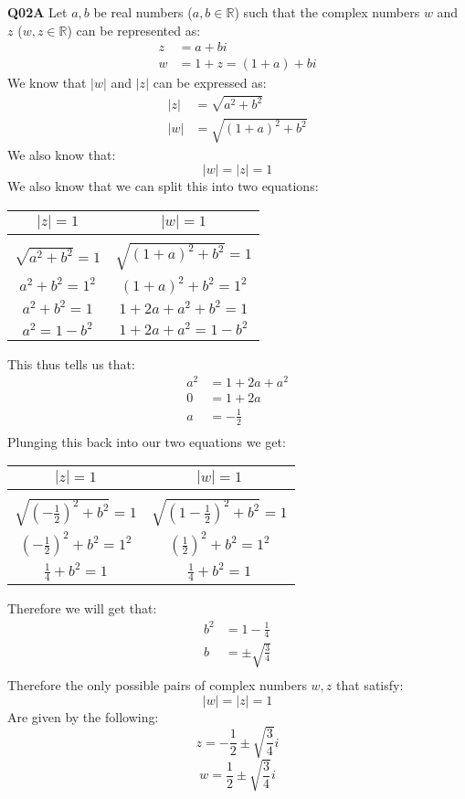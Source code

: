 \documentclass[11pt]{article}
\begin{document}
\parindent=0pt

\textbf{Q02A} Let $a, b$ be real numbers ($a,b \in \mathbb{R}$) such that the complex numbers $w$ and $z$  ($w,z \in \mathbb{R}$) can be represented as:
\begin{align*}
 z & = a + bi \\
 w  & = 1+ z = (1+a) + bi
\end{align*}
We know that $|w|$ and $|z|$ can be expressed as:
\begin{align*}
 |z| & = \sqrt{a^2 + b^2} \\
 |w|  & = \sqrt{ (1+a)^2 + b^2}
\end{align*}
We also know that:
\[ |w| = |z| = 1 \]
We also know that we can split this into two equations:
\begin{center}
 \begin{tabular}{ c  |  c } 
  $|z| = 1$ &  $|w| = 1$ \\ 
\hline\\
 $\sqrt{a^2 + b^2} = 1 $ & $\sqrt{ (1+a)^2 + b^2} = 1 $  \\ 
             $a^2 + b^2 = 1^2 $ &  $(1+a)^2 + b^2 = 1^2 $ \\ 
             $a^2 + b^2 = 1 $ &  $ 1 + 2a + a^2 + b^2 = 1 $ \\ 
             $a^2  = 1 - b^2 $ &  $ 1 + 2a + a^2 = 1 - b^2 $ \\ 

\end{tabular}
\end{center}
This thus tells us that:
\begin{align*}
a^2 &= 1 + 2a + a^2 \\
 0 &= 1 + 2a \\
 a & = -\frac{1}{2}\\
\end{align*}
Plunging this back into our two equations we get:
\begin{center}
\begin{tabular}{ c  |  c } 
  $|z| = 1$ &  $|w| = 1$ \\ 
\hline\\
 $\sqrt{(-\frac{1}{2})^2 + b^2} = 1 $ & $\sqrt{ (1-\frac{1}{2})^2 + b^2} = 1 $  \\ 
             $(-\frac{1}{2})^2  + b^2 = 1^2 $ &  $(\frac{1}{2})^2 + b^2 = 1^2 $ \\ 
             $\frac{1}{4} + b^2 = 1 $ &  $ \frac{1}{4} + b^2 = 1 $ \\ 
\end{tabular}
\end{center}
Therefore we will get that:
\begin{align*}
 b^2 &= 1 -  \frac{1}{4}  \\
 b & = \pm \sqrt{\frac{3}{4}}\\
\end{align*}
Therefore the only possible pairs of complex numbers $w,z$ that satisfy:
\[ |w| = |z| = 1 \]
Are given by the following:
\[ z = -\frac{1}{2} \pm \sqrt{\frac{3}{4}}i  \]
\[ w = \frac{1}{2} \pm \sqrt{\frac{3}{4}}i  \]
\end{document}
